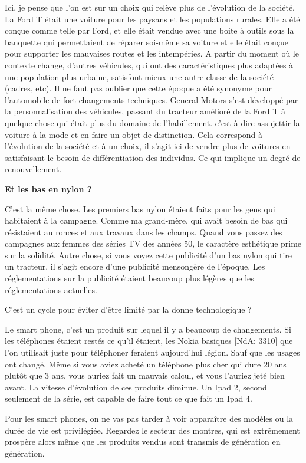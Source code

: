 \begin{small}
Ici, je pense que l'on est sur un choix qui relève plus de l'évolution de la société.
La Ford T était une voiture pour les paysans et les populations rurales. Elle a été conçue comme telle par Ford, et elle était vendue avec une boite à outils sous la banquette qui permettaient de réparer soi-même sa voiture et elle était conçue pour supporter les mauvaises routes et les intempéries.
A partir du moment où le contexte change, d'autres véhicules, qui ont des caractéristiques plus adaptées à une population plus urbaine, satisfont mieux une autre classe de la société (cadres, etc).
Il ne faut pas oublier que cette époque a été synonyme pour l'automobile de fort changements techniques. General Motors s'est développé par la personnalisation des véhicules, passant du tracteur amélioré de la Ford T à quelque chose qui était plus du domaine de l'habillement. c'est-à-dire assujettir la voiture à la mode et en faire un objet de distinction.
Cela correspond à l'évolution de la société et à un choix, il s'agit ici de vendre plus de voitures en satisfaisant le besoin de différentiation des individus. Ce qui implique un degré de renouvellement.

\textbf{Et les bas en nylon ?}
\smallbreak


C'est la même chose. Les premiers bas nylon étaient faits pour les gens qui habitaient à la campagne. Comme ma grand-mère, qui avait besoin de bas qui résistaient au ronces et aux travaux dans les champs.
Quand vous passez des campagnes aux femmes des séries TV des années 50, le caractère esthétique prime sur la solidité. Autre chose, si vous voyez cette publicité d'un bas nylon qui tire un tracteur, il s'agit encore d'une publicité mensongère de l'époque. Les réglementations sur la publicité étaient beaucoup plus légères que les réglementations actuelles.

C'est un cycle pour éviter d'être limité par la donne technologique ?

Le smart phone, c'est un produit sur lequel il y a beaucoup de changements. Si les téléphones étaient restés ce qu'il étaient, les Nokia basiques [NdA: 3310] que l'on utilisait juste pour téléphoner feraient aujourd'hui légion. Sauf que les usages ont changé. Même si vous aviez acheté un téléphone plus cher qui dure 20 ans plutôt que 3 ans, vous auriez fait un mauvais calcul, et vous l'auriez jeté bien avant. La vitesse d'évolution de ces produits diminue. Un Ipad 2, second seulement de la série, est capable de faire tout ce que fait un Ipad 4.

Pour les smart phones, on ne vas pas tarder à voir apparaître des modèles ou la durée de vie est privilégiée. Regardez le secteur des montres, qui est extrêmement prospère alors même que les produits vendus sont transmis de génération en génération.


\end{small}
